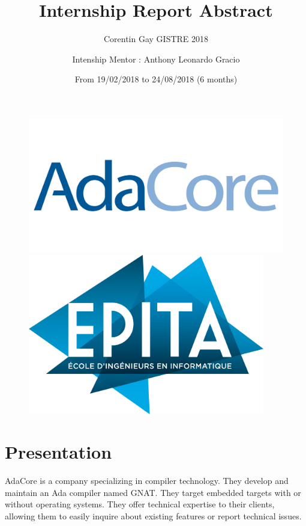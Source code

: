 \documentclass[12pt,]{article}
\title{Internship Report Abstract}
\author{Corentin Gay GISTRE 2018 \and Intenship Mentor : Anthony Leonardo Gracio}
\date{From 19/02/2018 to 24/08/2018 (6 months)}
\begin{document}

\maketitle
\begin{figure}
\centering
	\includegraphics{adacore.jpg}
	\includegraphics[height=7cm]{epita.png}
\end{figure}
\FloatBarrier

\thispagestyle{empty}
\clearpage

{
\hypersetup{linkcolor=}
\setcounter{tocdepth}{3}
\setcounter{tocdepth}{3}
}


\hypertarget{presentation}{%
\section{Presentation}\label{presentation}}

AdaCore is a company specializing in compiler technology. They develop
and maintain an Ada compiler named GNAT. They target embedded targets
with or without operating systems. They offer technical expertise to
their clients, allowing them to easily inquire about existing features
or report technical issues.
\end{document}
